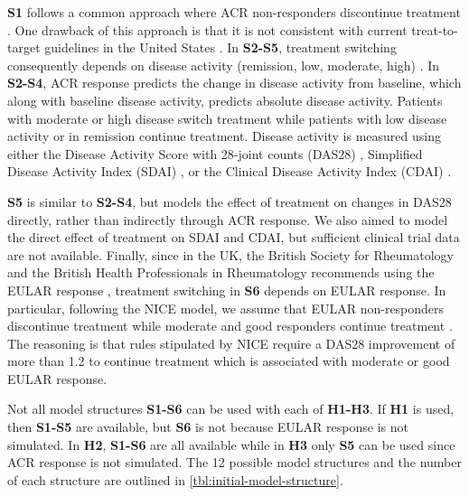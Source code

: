 \documentclass[11pt,final,fleqn]{article}\usepackage[]{graphicx}\usepackage[]{color}
\theoremstyle{plain}
\begin{document}
\textbf{S1} follows a common approach where ACR non-responders discontinue treatment \citep[e.g.][]{carlson2015economic, icer2017tim}. One drawback of this approach is that it is not consistent with current treat-to-target guidelines in the United States \citep{singh20162015}. In \textbf{S2-S5}, treatment switching consequently depends on disease activity (remission, low, moderate, high) \citep{anderson2012rheumatoid}. In \textbf{S2-S4}, ACR response predicts the change in disease activity from baseline, which along with baseline disease activity, predicts absolute disease activity. Patients with moderate or high disease switch treatment while patients with low disease activity or in remission continue treatment. Disease activity is measured using either the Disease Activity Score with 28-joint counts (DAS28) \citep{prevoo1995modified}, Simplified Disease Activity Index (SDAI) \citep{smolen2003simplified, aletaha2005simplified}, or the Clinical Disease Activity Index (CDAI) \citep{aletaha2005acute}. 

\textbf{S5} is similar to \textbf{S2-S4}, but models the effect of treatment on changes in DAS28 directly, rather than indirectly through ACR response. We also aimed to model the direct effect of treatment on SDAI and CDAI, but sufficient clinical trial data are not available. Finally, since in the UK, the British Society for Rheumatology and the British Health Professionals in Rheumatology recommends using the EULAR response \citep{deighton2010bsr}, treatment switching in \textbf{S6} depends on EULAR response. In particular, following the NICE model, we assume that EULAR non-responders discontinue treatment while moderate and good responders continue treatment \citep{stevenson2016adalimumab}. The reasoning is that rules stipulated by NICE require a DAS28 improvement of more than 1.2 to continue treatment which is associated with moderate or good EULAR response. 

Not all model structures \textbf{S1-S6} can be used with each of \textbf{H1-H3}. If \textbf{H1} is used, then \textbf{S1-S5} are available, but \textbf{S6} is not because EULAR response is not simulated. In \textbf{H2}, \textbf{S1-S6} are all available while in \textbf{H3} only \textbf{S5} can be used since ACR response is not simulated. The 12 possible model structures and the number of each structure are outlined in \autoref{tbl:initial-model-structure}.  
\end{document}
